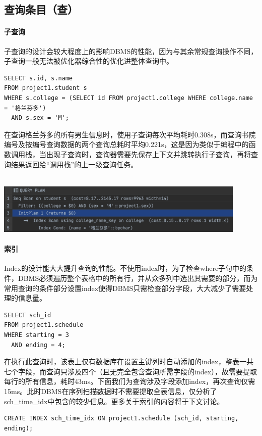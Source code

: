 \subsection{查询条目（查）}

\paragraph{子查询} 子查询的设计会较大程度上的影响DBMS的性能，因为与其余常规查询操作不同，子查询一般无法被优化器综合性的优化进整体查询中。
\begin{lstlisting}
SELECT s.id, s.name
FROM project1.student s
WHERE s.college = (SELECT id FROM project1.college WHERE college.name = '格兰芬多')
  AND s.sex = 'M';
\end{lstlisting}
\vspace{-2em}
\par 在查询格兰芬多的所有男生信息时，使用子查询每次平均耗时0.308s，而查询书院编号及按编号查询数据的两个查询总耗时平均0.221s，这是因为类似于编程中的函数调用栈，当出现子查询时，查询器需要先保存上下文并跳转执行子查询，再将查询结果返回给“调用栈”的上一级查询任务。\\~\\
\centerline{\includegraphics[width=0.9\textwidth]{dta/qp}}

\paragraph{索引} \par Index的设计能大大提升查询的性能。不使用index时，为了检查where子句中的条件，DBMS必须遍历整个表格中的所有行，并从众多列中选出其需要的部分，而为常用查询的条件部分设置index使得DBMS只需检查部分字段，大大减少了需要处理的信息量。
\begin{lstlisting}
SELECT sch_id
FROM project1.schedule
WHERE starting = 3
  AND ending = 4;
\end{lstlisting}
\vspace{-2em}
\par 在执行此查询时，该表上仅有数据库在设置主键列时自动添加的index，整表一共七个字段，而查询只涉及四个（且无完全包含查询所需字段的index），故需要提取每行的所有信息，耗时43ms。下面我们为查询涉及字段添加index，再次查询仅需15ms。此时DBMS在序列扫描数据时不需要提取全表信息，仅分析了sch\_time\_idx中包含的较少信息。更多关于索引的内容将于下文讨论。
\begin{lstlisting}
CREATE INDEX sch_time_idx ON project1.schedule (sch_id, starting, ending);
\end{lstlisting}
\vspace{-2em}
